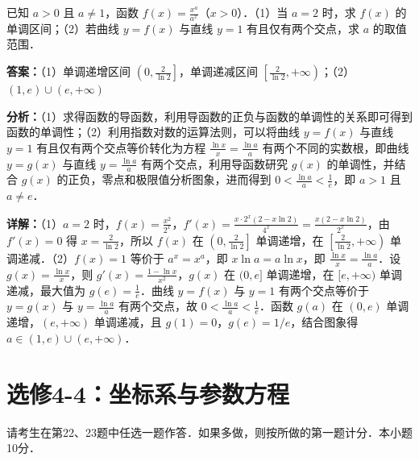 \begin{question}[points=12]
已知 $a>0$ 且 $a\neq 1$，函数 $f(x) = \frac{x^a}{a^x}$（$x>0$）．（1）当 $a=2$ 时，求 $f(x)$ 的单调区间；（2）若曲线 $y=f(x)$ 与直线 $y=1$ 有且仅有两个交点，求 $a$ 的取值范围．
\begin{solution}
\textbf{答案：}（1）单调递增区间 $\left(0, \frac{2}{\ln 2}\right]$，单调递减区间 $\left[\frac{2}{\ln 2}, +\infty\right)$；（2）$(1,e) \cup (e, +\infty)$

\textbf{分析：}（1）求得函数的导函数，利用导函数的正负与函数的单调性的关系即可得到函数的单调性；（2）利用指数对数的运算法则，可以将曲线 $y=f(x)$ 与直线 $y=1$ 有且仅有两个交点等价转化为方程 $\frac{\ln x}{x} = \frac{\ln a}{a}$ 有两个不同的实数根，即曲线 $y=g(x)$ 与直线 $y=\frac{\ln a}{a}$ 有两个交点，利用导函数研究 $g(x)$ 的单调性，并结合 $g(x)$ 的正负，零点和极限值分析图象，进而得到 $0<\frac{\ln a}{a}<\frac{1}{e}$，即 $a>1$ 且 $a\neq e$．

\textbf{详解：}（1）$a=2$ 时，$f(x)=\frac{x^2}{2^x}$，$f'(x)=\frac{x\cdot2^x(2-x\ln2)}{4^x}=\frac{x(2-x\ln2)}{2^x}$，由 $f'(x)=0$ 得 $x=\frac{2}{\ln2}$，所以 $f(x)$ 在 $\left(0,\frac{2}{\ln2}\right]$ 单调递增，在 $\left[\frac{2}{\ln2}, +\infty\right)$ 单调递减．（2）$f(x)=1$ 等价于 $a^x = x^a$，即 $x\ln a = a\ln x$，即 $\frac{\ln x}{x} = \frac{\ln a}{a}$．设 $g(x)=\frac{\ln x}{x}$，则 $g'(x)=\frac{1-\ln x}{x^2}$，$g(x)$ 在 $(0,e]$ 单调递增，在 $[e,+\infty)$ 单调递减，最大值为 $g(e)=\frac{1}{e}$．曲线 $y=f(x)$ 与 $y=1$ 有两个交点等价于 $y=g(x)$ 与 $y=\frac{\ln a}{a}$ 有两个交点，故 $0<\frac{\ln a}{a}<\frac{1}{e}$．函数 $g(a)$ 在 $(0,e)$ 单调递增，$(e,+\infty)$ 单调递减，且 $g(1)=0$，$g(e)=1/e$，结合图象得 $a\in(1,e)\cup(e,+\infty)$．
\end{solution}
\end{question}

\section*{选修4-4：坐标系与参数方程}
请考生在第22、23题中任选一题作答．如果多做，则按所做的第一题计分．本小题10分．

